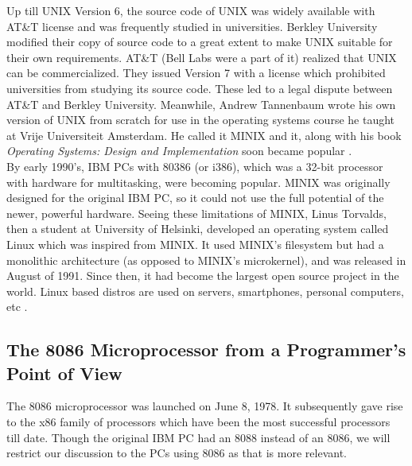 Up till UNIX Version 6, the source code of UNIX was widely available with AT\&T license and was frequently studied in universities. Berkley University modified their copy of source code to a great extent to make UNIX suitable for their own requirements. AT\&T (Bell Labs were a part of it) realized that UNIX can be commercialized. They issued Version 7 with a license which prohibited universities from studying its source code. These led to a legal dispute between AT\&T and Berkley University. Meanwhile, Andrew Tannenbaum wrote his own version of UNIX from scratch for use in the operating systems course he taught at Vrije Universiteit Amsterdam. He called it MINIX and it, along with his book \textit{Operating Systems: Design and Implementation} soon became popular \cite{tannenbaum2003operating}.\\ By early 1990's, IBM PCs with 80386 (or i386), which was a 32-bit processor with hardware for multitasking, were becoming popular. MINIX was originally designed for the original IBM PC, so it could not use the full potential of the newer, powerful hardware. Seeing these limitations of MINIX, Linus Torvalds, then a student at University of Helsinki, developed an operating system called Linux which was inspired from MINIX. It used MINIX's filesystem but had a monolithic architecture (as opposed to MINIX's microkernel), and was released in August of 1991. Since then, it had become the largest open source project in the world. Linux based distros are used on servers, smartphones, personal computers, etc \cite{torvalds2001just}.    

\subsection{The 8086 Microprocessor from a Programmer's Point of View}
The 8086 microprocessor was launched on June 8, 1978. It subsequently gave rise to the x86 family of processors which have been the most successful processors till date. Though the original IBM PC had an 8088 instead of an 8086, we will restrict our discussion to the PCs using 8086 as that is more relevant.

